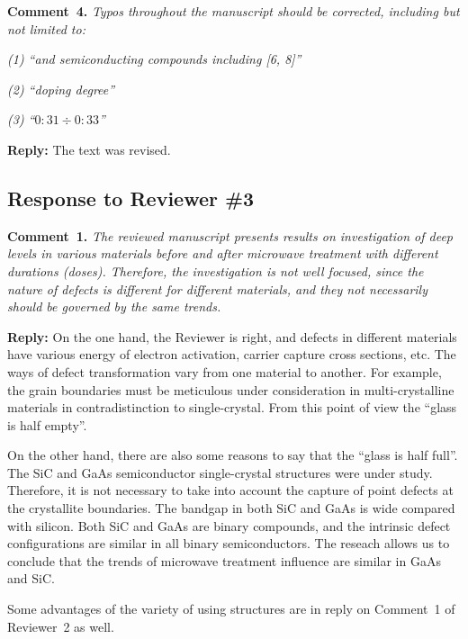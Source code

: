 \documentclass[10pt]{iopart}
\begin{document}
\vspace{1cm}
\noindent
\textcolor[rgb]{0.00,0.50,1.00}{\textbf{Comment~4.}}
\emph{Typos throughout the manuscript should be corrected, including but not limited to:}

\emph{(1) ``and semiconducting compounds including [6, 8]''}

\emph{(2) ``doping degree''}

\emph{(3) ``$0:31\div0:33$''}

\noindent
\textcolor[rgb]{0.51,0.00,0.00}{\textbf{Reply:}}
The text was revised.


\subsection*{Response to Reviewer \#3 }
\noindent
\textcolor[rgb]{0.00,0.50,1.00}{\textbf{Comment~1.}}
\emph{The reviewed manuscript presents results on investigation of deep levels
in various materials before and after microwave treatment with different durations (doses).
Therefore, the investigation is not well focused, since the nature of defects is different
for different materials, and they not necessarily should be governed by the same trends. }

\noindent
\textcolor[rgb]{0.51,0.00,0.00}{\textbf{Reply:}}
On the one hand, the Reviewer is right, and
defects in different materials
have various energy of electron activation, carrier capture
cross sections, etc.
The ways of defect transformation vary from one material to another.
For example, the grain boundaries must be meticulous under consideration
in multi-crystalline materials in contradistinction to single-crystal.
From this point of view the ``glass is half empty''.

On the other hand, there are also some reasons to say that the ``glass is half full''.
The SiC and GaAs semiconductor single-crystal structures were under study.
Therefore, it is not necessary to take into account
the capture of point defects at the crystallite boundaries.
The bandgap in both SiC and GaAs is wide compared with silicon.
Both SiC and GaAs are binary compounds, and
the intrinsic defect configurations are similar in all binary semiconductors.
The reseach allows us to conclude that the trends of microwave treatment influence are similar
in GaAs and SiC.


Some advantages of the variety of using structures are in reply on Comment~1 of Reviewer~2 as well.
\end{document}
